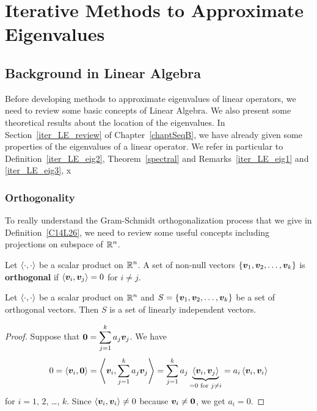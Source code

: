 \chapter{Iterative Methods to Approximate Eigenvalues}
\label{chapEigVal}

\section{Background in Linear Algebra}

Before developing methods to approximate eigenvalues of linear operators, we
need to review some basic concepts of Linear Algebra.  We also present some
theoretical results about the location of the eigenvalues.  In
Section~\ref{iter_LE_review} of Chapter~\ref{chaptSeqB}, we have already
given some properties of the eigenvalues of a linear operator.  We refer in
particular to Definition~\ref{iter_LE_eig2}, Theorem~\ref{spectral}
and Remarks~\ref{iter_LE_eig1} and \ref{iter_LE_eig3},
x
\subsection{Orthogonality}

To really understand the Gram-Schmidt orthogonalization process that
we give in Definition~\ref{C14L26}, we need to review some useful
concepts including projections on subspace of $\displaystyle \mathbb{R}^n$.

\begin{defn}
Let $\left\langle{\cdot} , {\cdot}\right\rangle$ be a scalar product on $\displaystyle \mathbb{R}^n$.  A set of
non-null vectors $\{\bm{v}_1, \bm{v}_2, \ldots , \bm{v}_k\}$ is
{\bfseries orthogonal} if
$\left\langle{\bm{v}_i} , {\bm{v}_j}\right\rangle = 0$ for $i\neq j$.
\end{defn}

\begin{prop}
Let $\left\langle{\cdot} , {\cdot}\right\rangle$ be a scalar product on $\displaystyle \mathbb{R}^n$ and
$S = \{\bm{v}_1, \bm{v}_2, \ldots , \bm{v}_k\}$ be a set of
orthogonal vectors.  Then $S$ is a set of linearly independent
vectors.
\end{prop}

\begin{proof}
Suppose that $\displaystyle \bm{0} = \sum_{j=1}^k a_j \bm{v}_j$.
We have
\[
0 = \left\langle{\bm{v}_i} , {\bm{0}}\right\rangle
= \left\langle{\bm{v}_i} , {\sum_{j=1}^k a_j \bm{v}_j}\right\rangle
= \sum_{j=1}^k a_j
\underbrace{\left\langle{\bm{v}_i} , {\bm{v}_j}\right\rangle}_{=0\text{ for } j\neq i}
= a_i \left\langle{\bm{v}_i} , {\bm{v}_i}\right\rangle
\]
for $i=1$, $2$, \ldots, $k$.  Since $\left\langle{\bm{v}_i} , {\bm{v}_i}\right\rangle \neq 0$
because $\bm{v}_i \neq \bm{0}$, we get $a_i=0$.
\end{proof}

